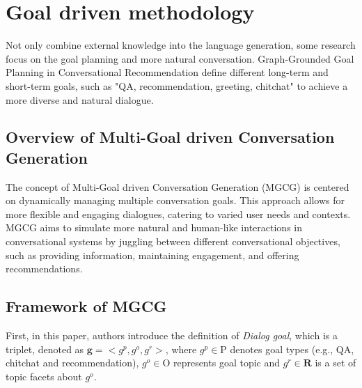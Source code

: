 \documentclass[11pt]{article}
\begin{document}
\section{Goal driven methodology}
Not only combine external knowledge into the language generation, some research focus on the goal planning and more natural conversation. Graph-Grounded Goal Planning in Conversational Recommendation \citet{liuGraphGroundedGoalPlanning2022} define different long-term and short-term goals, such as "QA, recommendation, greeting, chitchat" to achieve a more diverse and natural dialogue.
\subsection{Overview of Multi-Goal driven Conversation Generation}
The concept of Multi-Goal driven Conversation Generation (MGCG) is centered on dynamically managing multiple conversation goals. This approach allows for more flexible and engaging dialogues, catering to varied user needs and contexts. MGCG aims to simulate more natural and human-like interactions in conversational systems by juggling between different conversational objectives, such as providing information, maintaining engagement, and offering recommendations.


\subsection{Framework of MGCG}
First, in this paper, authors introduce the definition of \textit{Dialog goal}, which is a triplet, denoted as $\mathbf{g} = <g^p, g^o, g^r>$, where $g^p \in \mathrm{P}$ denotes goal types (e.g., QA, chitchat and recommendation), $g^o \in \mathrm{O}$ represents goal topic and $g^r \in \mathbf{R}$ is a set of topic facets about $g^o$. \citet{liuGraphGroundedGoalPlanning2022}
\end{document}
